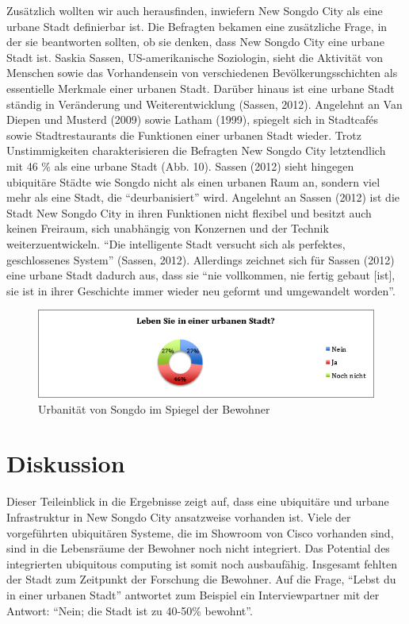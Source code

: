 \documentclass[a4paper,
fontsize=11pt,
oneside,
numbers=noperiodatend,
parskip=half-,
bibliography=totoc,
final
]{scrartcl}
\begin{document}
Zusätzlich wollten wir auch herausfinden, inwiefern New Songdo City als
eine urbane Stadt definierbar ist. Die Befragten bekamen eine
zusätzliche Frage, in der sie beantworten sollten, ob sie denken, dass
New Songdo City eine urbane Stadt ist. Saskia Sassen, US-amerikanische
Soziologin, sieht die Aktivität von Menschen sowie das Vorhandensein von
verschiedenen Bevölkerungsschichten als essentielle Merkmale einer
urbanen Stadt. Darüber hinaus ist eine urbane Stadt ständig in
Veränderung und Weiterentwicklung (Sassen, 2012). Angelehnt an Van
Diepen und Musterd (2009) sowie Latham (1999), spiegelt sich in
Stadtcafés sowie Stadtrestaurants die Funktionen einer urbanen Stadt
wieder. Trotz Unstimmigkeiten charakterisieren die Befragten New Songdo
City letztendlich mit 46 \% als eine urbane Stadt (Abb. 10). Sassen
(2012) sieht hingegen ubiquitäre Städte wie Songdo nicht als einen
urbanen Raum an, sondern viel mehr als eine Stadt, die
\enquote{deurbanisiert} wird. Angelehnt an Sassen (2012) ist die Stadt
New Songdo City in ihren Funktionen nicht flexibel und besitzt auch
keinen Freiraum, sich unabhängig von Konzernen und der Technik
weiterzuentwickeln. \enquote{Die intelligente Stadt versucht sich als
perfektes, geschlossenes System} (Sassen, 2012). Allerdings zeichnet
sich für Sassen (2012) eine urbane Stadt dadurch aus, dass sie
\enquote{nie vollkommen, nie fertig gebaut {[}ist{]}, sie ist in ihrer
Geschichte immer wieder neu geformt und umgewandelt worden}.

\begin{figure}[htbp]
\centering
\includegraphics{img/Abbildung10.jpg}
\caption{Urbanität von Songdo im Spiegel der Bewohner}
\end{figure}

\section*{Diskussion}\label{diskussion}

Dieser Teileinblick in die Ergebnisse zeigt auf, dass eine ubiquitäre
und urbane Infrastruktur in New Songdo City ansatzweise vorhanden ist.
Viele der vorgeführten ubiquitären Systeme, die im Showroom von Cisco
vorhanden sind, sind in die Lebensräume der Bewohner noch nicht
integriert. Das Potential des integrierten ubiquitous computing ist
somit noch ausbaufähig. Insgesamt fehlten der Stadt zum Zeitpunkt der
Forschung die Bewohner. Auf die Frage, \enquote{Lebst du in einer
urbanen Stadt} antwortet zum Beispiel ein Interviewpartner mit der
Antwort: \enquote{Nein; die Stadt ist zu 40-50\% bewohnt}.
\end{document}
